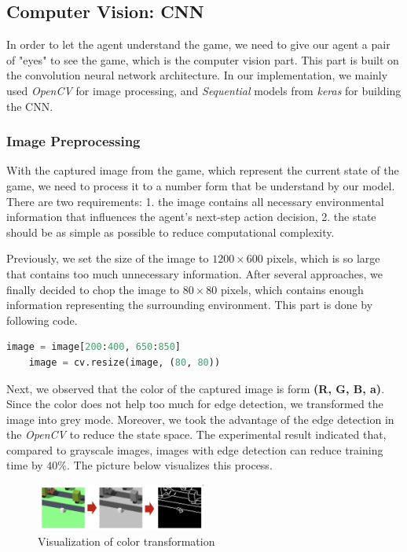 \documentclass{article}
\begin{document}
\subsection{Computer Vision: CNN}
In order to let the agent understand the game, we need to give our agent a pair of "eyes" to see the game, which is the computer vision part. This part is built on the convolution neural network architecture. In our implementation, we mainly used \textit{OpenCV} for image processing, and \textit{Sequential} models from \textit{keras} for building the CNN.

\subsubsection{Image Preprocessing}
With the captured image from the game, which represent the current state of the game,  we need to process it to a number form that be understand by our model. There are two requirements: 1. the image contains all necessary environmental information that influences the agent's next-step action decision, 2. the state should be as simple as possible to reduce computational complexity. 

Previously, we set the size of the image to $1200 \times 600$ pixels, which is so large that contains too much unnecessary information. After several approaches, we finally decided to chop the image to $80 \times 80$ pixels, which contains enough information representing the surrounding environment. This part is done by following code. 

\begin{lstlisting}[language=Python]
    image = image[200:400, 650:850]
    image = cv.resize(image, (80, 80))
\end{lstlisting}

Next, we observed that the color of the captured image is form \textbf{(R, G, B, a)}. Since the color does not help too much for edge detection, we transformed the image into grey mode. Moreover, we took the advantage of the edge detection in the \textit{OpenCV} to reduce the state space. The experimental result indicated that, compared to grayscale images, images with edge detection can reduce training time by $40\%$. The picture below visualizes this process. 

\begin{figure}[h]
\caption{Visualization of color transformation}
\centering
\includegraphics[width=0.5\textwidth]{color_transform_visualization.png}
\end{figure}
\end{document}
